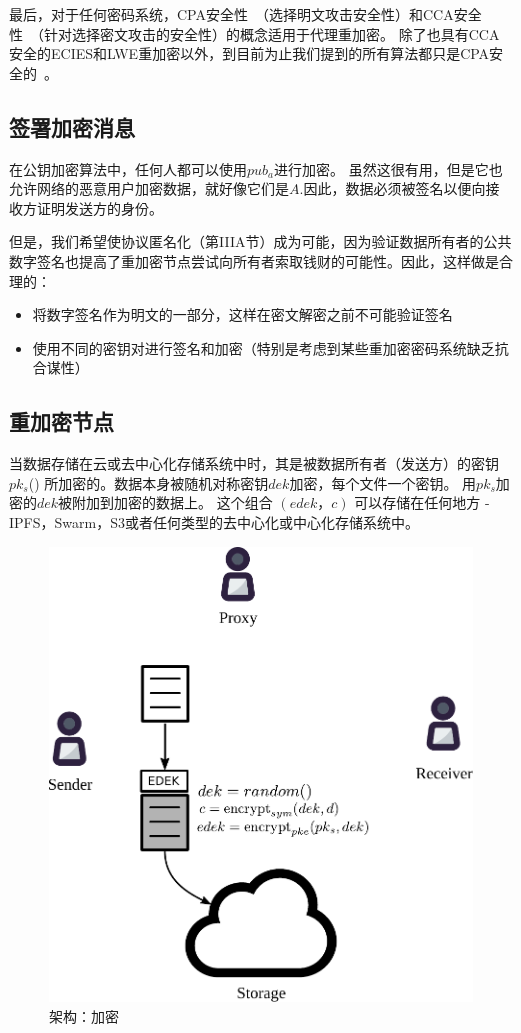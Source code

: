 \documentclass[longbibliography,nofootinbib]{revtex4-1}
\begin{document}
最后，对于任何密码系统，CPA安全性~\cite{wiki:cpa}（选择明文攻击安全性）和CCA安全性~\cite{wiki:cca}（针对选择密文攻击的安全性）的概念适用于代理重加密。 除了也具有CCA安全的ECIES和LWE重加密以外，到目前为止我们提到的所有算法都只是CPA安全的~\cite{lwe-reencryption}。


\subsection{签署加密消息}

    在公钥加密算法中，任何人都可以使用$pub_a$进行加密。 虽然这很有用，但是它也允许网络的恶意用户加密数据，就好像它们是$A$.因此，数据必须被签名以便向接收方证明发送方的身份。
    
    但是，我们希望使协议匿名化（第IIIA节）成为可能，因为验证数据所有者的公共数字签名也提高了重加密节点尝试向所有者索取钱财的可能性。因此，这样做是合理的：

\begin{itemize}
    \item 将数字签名作为明文的一部分，这样在密文解密之前不可能验证签名
    \item 使用不同的密钥对进行签名和加密（特别是考虑到某些重加密密码系统缺乏抗合谋性）
\end{itemize}

\subsection{重加密节点}

当数据存储在云或去中心化存储系统中时，其是被数据所有者（发送方）的密钥$pk_s$() 所加密的。数据本身被随机对称密钥$dek$加密，每个文件一个密钥。 用$pk_s$加密的$dek$被附加到加密的数据上。 这个组合 $(edek，c)$ 可以存储在任何地方 - IPFS，Swarm，S3或者任何类型的去中心化或中心化存储系统中。

\begin{figure}
\centering
    \includegraphics[width=0.4\columnwidth]{pdf/encrypt.pdf}
    \caption{架构：加密}
    \label{fig:arch-encrypt}
\end{figure}
\end{document}
